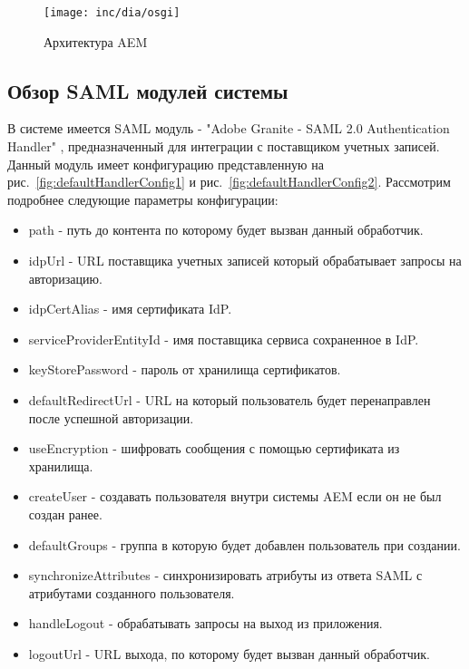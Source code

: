 \begin{figure}[h]
  \centering
  \texttt{[image: inc/dia/osgi]}
  \caption{Архитектура AEM}
  \label{fig:fig02}
\end{figure}

\subsection{Обзор SAML модулей системы}
В системе имеется SAML модуль - "Adobe Granite - SAML 2.0 Authentication Handler" \cite{web:aemSaml}, предназначенный для интеграции с поставщиком учетных записей. Данный модуль имеет конфигурацию представленную на рис.~\ref{fig:defaultHandlerConfig1} и рис.~\ref{fig:defaultHandlerConfig2}. Рассмотрим подробнее следующие параметры конфигурации:
\begin{itemize}
\item path - путь до контента по которому будет вызван данный обработчик.
\item idpUrl - URL поставщика учетных записей который обрабатывает запросы на авторизацию.
\item idpCertAlias - имя сертификата IdP.
\item serviceProviderEntityId - имя поставщика сервиса сохраненное в IdP.
\item keyStorePassword - пароль от хранилища сертификатов.
\item defaultRedirectUrl - URL на который пользователь будет перенаправлен после успешной авторизации.
\item useEncryption - шифровать сообщения с помощью сертификата из хранилища.
\item createUser - создавать пользователя внутри системы AEM если он не был создан ранее.
\item defaultGroups - группа в которую будет добавлен пользователь при создании.
\item synchronizeAttributes - синхронизировать атрибуты из ответа SAML с атрибутами созданного пользователя.
\item handleLogout - обрабатывать запросы на выход из приложения.
\item logoutUrl - URL выхода, по которому будет вызван данный обработчик.
\end{itemize}

